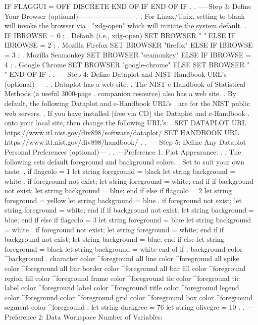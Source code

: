    IF FLAGGUI = OFF
      DISCRETE
   END OF IF
END OF IF
.
. -----Step 3: Define Your Browser (optional)------------------------
.
.      For Linux/Unix, setting to blank will invoke the browser via
.      "xdg-open" which will initiate the system default.
.
IF IBROWSE = 0  ; . Default (i.e., xdg-open)
   SET BROWSER " "
ELSE IF IBROWSE = 2  ; . Mozilla Firefox
   SET BROWSER "firefox"
ELSE IF IBROWSE = 3  ; . Mozilla Seamonkey
   SET BROWSER "seamonkey"
ELSE IF IBROWSE = 4  ; . Google Chrome
   SET BROWSER "google-chrome"
ELSE
   SET BROWSER " "
END OF IF
.
. -----Step 4: Define Dataplot and NIST Handbook URL's (optional)----
.
.  Dataplot has a web site.
.  The NIST e-Handbook of Statistical Methods (a useful 3000-page
.  companion resource) also has a web site.
.  By default, the following Dataplot and e-Handbook URL's
.  are for the NIST public web servers.
.  If you have installed (free via CD) the Dataplot and e-Handbook
.  onto your local site, then change the following URL's:
.
SET DATAPLOT URL https://www.itl.nist.gov/div898/software/dataplot/
SET HANDBOOK URL https://www.itl.nist.gov/div898/handbook/
.
. -----Step 5: Define Any Dataplot Personal Preferences (optional)---
.
. ---Preference 1: Plot Appearance:
.
.  The following sets default foreground and background colors.
.  Set to suit your own taste.
.
if flagcolo = 1
   let string foreground = black
   let string background = white
   .
   if foreground not exist; let string foreground = white; end if
   if background not exist; let string background = blue; end if
else if flagcolo = 2
   let string foreground = yellow
   let string background = blue
   .
   if foreground not exist; let string foreground = white; end if
   if background not exist; let string background = blue; end if
else if flagcolo = 3
   let string foreground = blue
   let string background = white
   .
   if foreground not exist; let string foreground = white; end if
   if background not exist; let string background = blue; end if
else
   let string foreground = black
   let string background = white
end of if
.
background color ^background
.
character color ^foreground all
line color ^foreground all
spike color ^foreground all
bar border color ^foreground all
bar fill color ^foreground
region fill color ^foreground
frame color ^foreground
tic color ^foreground
tic label color ^foreground
label color ^foreground
title color ^foreground
legend color ^foreground
color ^foreground
grid color ^foreground
box color ^foreground
segment color ^foreground
.
let string darkgree = 76
let string olivegre = 10
.
. ---Preference 2: Data Workspace Number of Variables:
